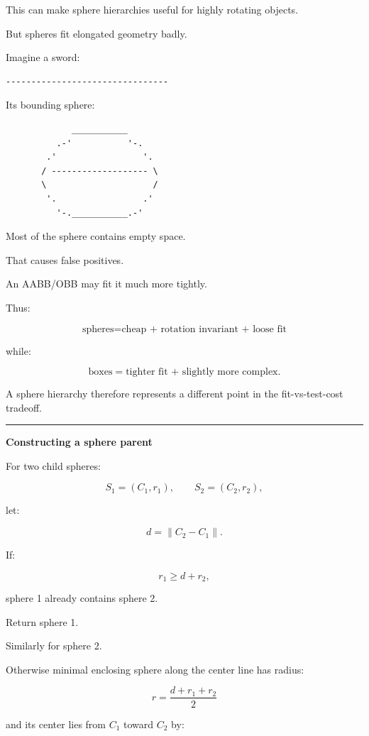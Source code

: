 This can make sphere hierarchies useful for highly rotating objects.

But spheres fit elongated geometry badly.

Imagine a sword:

\begin{verbatim}
--------------------------------
\end{verbatim}

Its bounding sphere:

\begin{verbatim}
             ___________
          .-'           '-.
        .'                 '.
       / ------------------- \
       \                     /
        '.                 .'
          '-.___________.-'
\end{verbatim}

Most of the sphere contains empty space.

That causes false positives.

An AABB/OBB may fit it much more tightly.

Thus:

\[
\text{spheres}
=
\text{cheap + rotation invariant + loose fit}
\]

while:

\[
\text{boxes}
=
\text{tighter fit + slightly more complex}.
\]

A sphere hierarchy therefore represents a different point in the fit-vs-test-cost tradeoff.

\begin{center}\rule{0.5\linewidth}{0.5pt}\end{center}

\textbf{Constructing a sphere parent}

For two child spheres:

\[
S_1=(C_1,r_1),
\qquad
S_2=(C_2,r_2),
\]

let:

\[
d=\|C_2-C_1\|.
\]

If:

\[
r_1\ge d+r_2,
\]

sphere 1 already contains sphere 2.

Return sphere 1.

Similarly for sphere 2.

Otherwise minimal enclosing sphere along the center line has radius:

\[
\boxed{
r=
\frac{d+r_1+r_2}{2}
}
\]

and its center lies from \(C_1\) toward \(C_2\) by:

